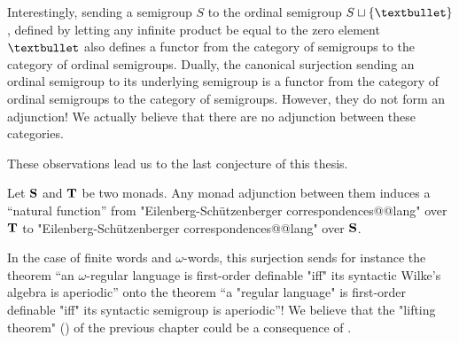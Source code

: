 Interestingly, sending a semigroup $S$ to the ordinal semigroup
$S \dcup \{\textbullet\}$, defined by letting any infinite product
be equal to the zero element $\textbullet$ also defines a functor
from the category of semigroups to the category of ordinal semigroups.
Dually, the canonical surjection sending an ordinal semigroup to
its underlying semigroup is a functor from
the category of ordinal semigroups to the category of semigroups.
However, they do not form an adjunction!
We actually believe that there are no adjunction between these categories.

These observations lead us to the last conjecture of this thesis.
\begin{conjecture}
	\AP\label{conj:projecting-algebraic-characterizations}
	Let $\Monad[S]$ and $\Monad[T]$ be two monads.
	Any monad adjunction between them induces
	a ``natural function'' from "Eilenberg-Schützenberger correspondences@@lang" over $\Monad[T]$
	to "Eilenberg-Schützenberger correspondences@@lang" over $\Monad[S]$.
\end{conjecture}

In the case of finite words and $\omega$-words, this
surjection sends for instance the theorem
``an $\omega$-regular language is first-order definable "iff" its
syntactic Wilke's algebra is aperiodic'' onto the theorem
``a "regular language" is first-order definable "iff" its
syntactic semigroup is aperiodic''!
We believe that the "lifting theorem" ()
of the previous chapter could be a consequence of
.